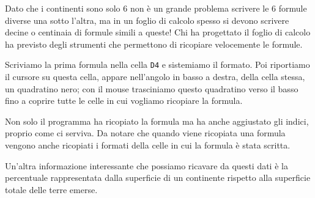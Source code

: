 Dato che i continenti sono solo \(6\) non è un grande problema scrivere le 
\(6\) formule diverse una sotto l'altra, ma in un foglio di calcolo spesso si 
devono scrivere decine o centinaia di formule simili a queste!
Chi ha progettato il foglio di calcolo ha previsto degli strumenti che
permettono di ricopiare velocemente le formule.

Scriviamo la prima formula nella cella \texttt{D4} e sistemiamo il formato.
Poi riportiamo il cursore su questa cella,
appare nell'angolo in basso a destra, della cella stessa, un quadratino nero;
con il mouse trasciniamo questo quadratino verso il basso fino a coprire
tutte le celle in cui vogliamo ricopiare la formula.

Non solo il programma ha ricopiato la formula ma ha anche aggiustato gli
indici, proprio come ci serviva.
Da notare che quando viene ricopiata una formula vengono anche ricopiati i
formati della celle in cui la formula è stata scritta.

\salvare

Un'altra informazione interessante che possiamo ricavare da questi dati è la 
percentuale rappresentata dalla superficie di un continente rispetto alla 
superficie totale delle terre emerse.


